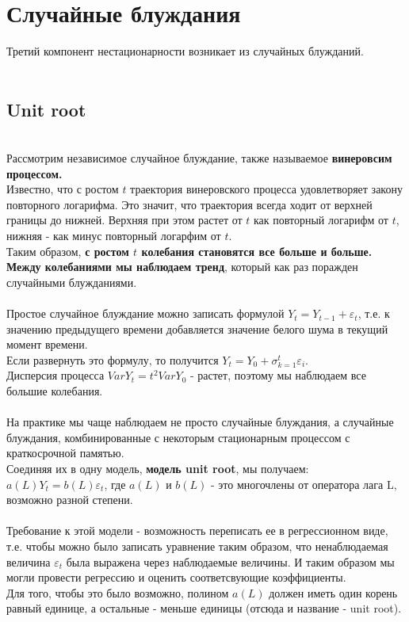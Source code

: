 \documentclass{article}
\begin{document}
\section{Случайные блуждания}
\begin{itemize}
    
    Третий компонент нестационарности возникает из случайных блужданий.
    \\
    \\
    \subsection{Unit root}
    \\ Рассмотрим независимое случайное блуждание, также называемое \textbf{винеровсим процессом.} 
    \\Известно, что с ростом $t$ траектория винеровского процесса удовлетворяет закону повторного логарифма. Это значит, что траектория всегда ходит от верхней границы до нижней. Верхняя при этом растет от $t$ как повторный логарифм от $t$, нижняя - как минус повторный логарфим от $t$. 
    \\Таким образом, \textbf{с ростом $t$ колебания становятся все больше и больше. Между колебаниями мы наблюдаем тренд}, который как раз поражден случайными блужданиями.
    \\
    \\ Простое случайное блуждание можно записать формулой $Y_t = Y_{t-1} + \varepsilon_t$, т.е. к значению предыдущего времени добавляется значение белого шума в текущий момент времени. 
    \\ Если развернуть это формулу, то получится $Y_t = Y_0 + \sigma_{k=1}^t \varepsilon_i$.
    \\ Дисперсия процесса $Var Y_t = t^2 Var Y_0$ - растет, поэтому мы наблюдаем все большие колебания.
    \\
    \\ На практике мы чаще наблюдаем не просто случайные блуждания, а случайные блуждания, комбинированные с некоторым стационарным процессом с краткосрочной памятью. 
    \\Соединяя их в одну модель, \textbf{модель unit root}, мы получаем: $a(L)Y_t = b(L)\varepsilon_t$, где $a(L)$ и $b(L)$ - это многочлены от оператора лага L, возможно разной степени.
    \\
    \\ Требование к этой модели - возможность переписать ее в регрессионном виде, т.е. чтобы можно было записать уравнение таким образом, что ненаблюдаемая величина $\varepsilon_t$ была выражена через наблюдаемые величины. И таким образом мы могли провести регрессию и оценить соответсвующие коэффициенты.
    \\ Для того, чтобы это было возможно, полином $a(L)$ должен иметь один корень равный единице, а остальные - меньше единицы (отсюда и название - unit root).
    \\
    \\

\end{itemize}
\end{document}
